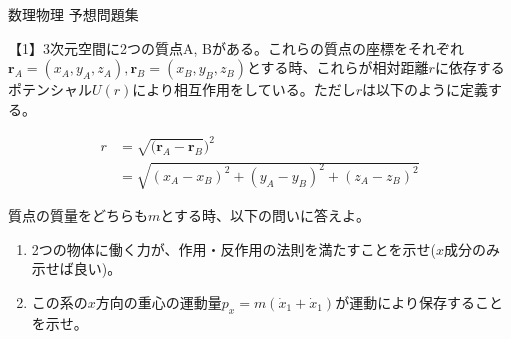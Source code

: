 \documentclass{jsarticle}
\begin{document}
\begin{center}
    {\huge 数理物理 予想問題集}\\
\end{center}

【1】3次元空間に2つの質点A, Bがある。これらの質点の座標をそれぞれ$\bm{r}_A = (x_A,y_A,z_A), \bm{r}_B = (x_B,y_B,z_B)$とする時、これらが相対距離$r$に依存するポテンシャル$U(r)$により相互作用をしている。ただし$r$は以下のように定義する。

$$
    \begin{aligned}
        r & = \sqrt{(\boldsymbol{r}_A -\boldsymbol{r}_B})^2 \\
          & = \sqrt{(x_A-x_B)^2+(y_A-y_B)^2+(z_A-z_B)^2}
    \end{aligned}
$$

質点の質量をどちらも$m$とする時、以下の問いに答えよ。

\begin{enumerate}
    \item 2つの物体に働く力が、作用・反作用の法則を満たすことを示せ($x$成分のみ示せば良い)。
    \item この系の$x$方向の重心の運動量$p_x = m(\dot{x}_1 + \dot{x}_1)$が運動により保存することを示せ。

\end{enumerate}
\end{document}

